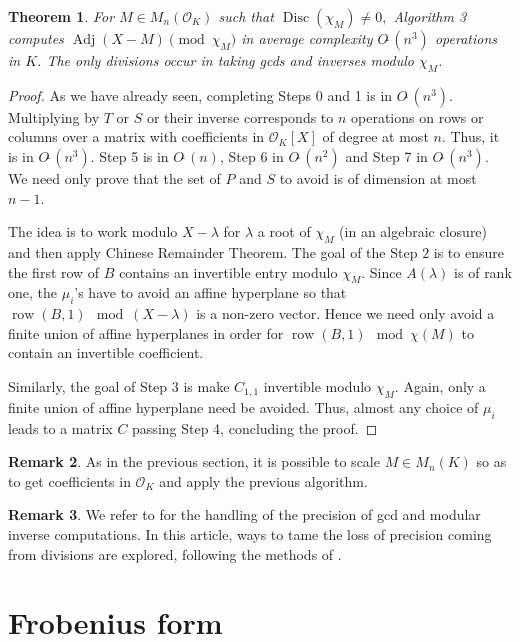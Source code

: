 \documentclass[sigconf]{acmart}
\DeclareMathOperator{\adj}{Adj}
\DeclareMathOperator{\disc}{Disc}
\DeclareMathOperator{\row}{row}
\newcommand{\OK}{\mathcal{O}_K}
\newcommand{\softO}{O\tilde{~}}
\newtheorem{theo}{Theorem}[section]
\theoremstyle{definition}
\newtheorem{rem}[theo]{Remark}
\begin{document}
\begin{theo}
\label{thm:alg3}
For $M \in M_n(\OK)$ such that $\disc( \chi_M) \neq 0,$
Algorithm 3 computes
$\adj (X-M) \pmod{\chi_M}$ in average complexity $\softO (n^3)$
operations in $K$.
The only divisions occur in taking gcds and inverses modulo $\chi_M$.
\end{theo}
\begin{proof}
As we have already seen, completing Steps 0 and 1 is in $\softO (n^3).$
Multiplying by $T$ or $S$ or their inverse corresponds
to $n$ operations on rows or columns over a matrix with coefficients
in $\OK[X]$ of degree at most $n$.
Thus, it is in $\softO(n^3).$
Step 5 is in $\softO(n)$, Step 6 in $\softO(n^2)$ and Step 7 in $\softO(n^3)$.
We need only prove that the set of $P$ and $S$ to avoid
is of dimension at most $n-1$.

The idea is to work modulo $X-\lambda$
for $\lambda$ a root of $\chi_M$ (in an algebraic closure)
and then apply Chinese Remainder Theorem.
The goal of the Step $2$ is to ensure the first row of $B$ contains an
invertible entry modulo $\chi_M$.
Since $A(\lambda)$ is of rank one, the $\mu_i$'s have to avoid an
affine hyperplane so that $\row(B,1) \mod (X-\lambda)$ is a non-zero vector.
Hence we need only avoid a finite union of affine hyperplanes
in order for $\row(B,1) \mod \chi (M)$ to contain an invertible coefficient.

Similarly, the goal of Step 3 is make $C_{1,1}$ invertible modulo
$\chi_M$.  Again, only a finite union of affine
hyperplane need be avoided.
Thus, almost any choice of $\mu_i$ leads to a matrix $C$ passing
Step 4, concluding the proof.
\end{proof}


\begin{rem}
As in the previous section, it is possible
to scale $M \in M_n(K)$ so as to
get coefficients in $\OK$ and apply the previous algorithm.
\end{rem}
\begin{rem}
We refer to \cite{caruso:15a} for the handling
of the precision of gcd and modular inverse computations.
In this article, ways to tame the loss of precision
coming from divisions are explored, following
the methods of \cite{caruso-roe-vaccon:14a}.
\end{rem}


\section{Frobenius form}
\label{sec:diffFrob}
\end{document}
